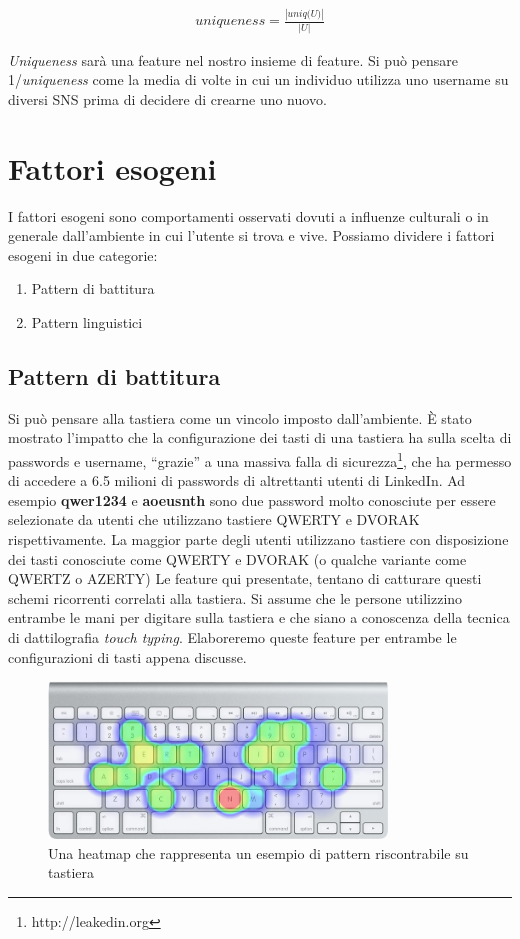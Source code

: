 \begin{gather*}
   \textit{uniqueness} = \frac{|\textit{uniq(U)}|}{|\textit{U}|}
\end{gather*}

\textit{Uniqueness} sarà una feature nel nostro insieme di feature. Si può pensare 1/\textit{uniqueness} come la media di volte in cui un individuo utilizza uno username su diversi SNS prima di decidere di crearne uno nuovo.

\section{Fattori esogeni}
I fattori esogeni sono comportamenti osservati dovuti a influenze culturali o in generale dall'ambiente in cui l'utente si trova e vive. Possiamo dividere i fattori esogeni in due categorie:

\begin{enumerate}
  \item Pattern di battitura
  \item Pattern linguistici
\end{enumerate}

\subsection{Pattern di battitura}
Si può pensare alla tastiera come un vincolo imposto dall'ambiente. È stato mostrato\cite{doctorow} l'impatto che la configurazione dei tasti di una tastiera ha sulla scelta di passwords e username, “grazie” a una massiva falla di sicurezza\footnote{http://leakedin.org}, che ha permesso di accedere a 6.5 milioni di passwords di altrettanti utenti di LinkedIn. Ad esempio \textbf{qwer1234} e \textbf{aoeusnth} sono due password molto conosciute per essere selezionate da utenti che utilizzano tastiere QWERTY e DVORAK rispettivamente. La maggior parte degli utenti utilizzano tastiere con disposizione dei tasti conosciute come QWERTY e DVORAK (o qualche variante come QWERTZ o AZERTY)\cite{keylayout}\newline
Le feature qui presentate, tentano di catturare questi schemi ricorrenti correlati alla tastiera. Si assume che le persone utilizzino entrambe le mani per digitare sulla tastiera e che siano a conoscenza della tecnica di dattilografia \textit{touch typing}\cite{touchtyping}. Elaboreremo queste feature per entrambe le configurazioni di tasti appena discusse.

\begin{figure}[bp!]
\centering
\includegraphics[width=90mm]{chapters/img/heatmapkey.png}
\caption{Una heatmap che rappresenta un esempio di pattern riscontrabile su tastiera  \label{overflow}}
\end{figure}

